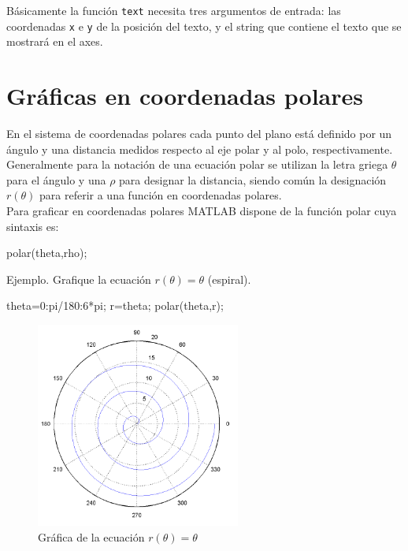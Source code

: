 Básicamente la función \texttt{text} necesita tres argumentos de entrada: las 
coordenadas \texttt{x} e \texttt{y} de la posición del texto, y el string 
que contiene el texto que se mostrará en el axes.

\section{Gráficas en coordenadas polares}

En el sistema de coordenadas polares cada punto del plano está definido
por un ángulo y una distancia medidos respecto al eje polar y al polo,
respectivamente. Generalmente para la notación de una ecuación polar se
utilizan la letra griega $\theta$ para el ángulo y una $\rho$ 
para designar la distancia, siendo común la designación $r(\theta)$
para referir a una función en coordenadas polares. \\

Para graficar en coordenadas polares MATLAB dispone de la función polar
cuya sintaxis es:

\begin{matlab}
polar(theta,rho);
\end{matlab}

Ejemplo. Grafique la ecuación $ r(\theta) = \theta $ (espiral).

\begin{matlab}
theta=0:pi/180:6*pi;
r=theta;
polar(theta,r);
\end{matlab}

\begin{figure}[htbp]
    \centering
    \includegraphics[width=0.6\textwidth]{src/img/ch4/img_4_6.png}
    \caption{Gráfica de la ecuación $r(\theta) = \theta$}
    \label{fig:img_4_6}
\end{figure}

